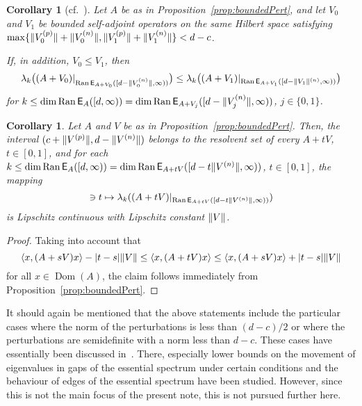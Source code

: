 \documentclass[11pt,a4paper]{amsart}
\numberwithin{equation}{section}
\DeclareMathOperator{\Ran}{Ran}
\DeclareMathOperator{\Dom}{Dom}
\DeclarePairedDelimiter{\abs}{|}{|}
\DeclarePairedDelimiter{\norm}{\lVert}{\rVert}
\DeclarePairedDelimiter{\scprod}{\langle}{\rangle}
\newcommand{\EE}{\mathsf{E}}
\theoremstyle{plain}
\newtheorem{corollary}[theorem]{Corollary}
\theoremstyle{definition}
\theoremstyle{remark}
\begin{document}
\begin{corollary}[{cf.~\cite[Theorem~3.15\,(2) and Theorem~3.14]{NSTTV18}}]\label{cor:monotonicity}
  Let $A$ be as in Proposition~\ref{prop:boundedPert}, and let $V_0$ and $V_1$ be bounded self-adjoint operators on the same
  Hilbert space satisfying $\max\{ \norm{V_0^{(p)}} + \norm{V_0^{(n)}} , \norm{V_1^{(p)}} + \norm{V_1^{(n)}} \} < d - c$.

  If, in addition, $V_0 \le V_1$, then
  \begin{equation*}
    \lambda_k\bigl( (A+V_0)|_{\Ran\EE_{A+V_0}([d-\norm{V_0^{(n)}},\infty))} \bigr)
    \le
    \lambda_k\bigl( (A+V_1)|_{\Ran\EE_{A+V_1}([d-\norm{V_1}^{(n)},\infty))} \bigr)
  \end{equation*}
  for $k \le \dim\Ran\EE_A([d,\infty)) = \dim\Ran\EE_{A+V_j}([d-\norm{V_j^{(n)}},\infty))$, $j\in\{0,1\}$.
\end{corollary}

\begin{corollary}\label{cor:continuity}
  Let $A$ and $V$ be as in Proposition~\ref{prop:boundedPert}. Then, the interval $(c+\norm{V^{(p)}} , d-\norm{V^{(n)}})$ belongs
  to the resolvent set of every $A+tV$, $t \in [0,1]$, and for each
  $k \le \dim \Ran \EE_A([d,\infty)) = \dim \Ran \EE_{A+tV}([d-t\norm{V^{(n)}},\infty))$, $t \in [0,1]$, the mapping
  \begin{equation*}
    [0,1]
    \ni
    t
    \mapsto
    \lambda_k((A+tV)|_{\Ran\EE_{A+tV}([d-t\norm{V^{(n)}},\infty))})
  \end{equation*}
  is Lipschitz continuous with Lipschitz constant $\norm{V}$.
\end{corollary}

\begin{proof}
  Taking into account that
  \begin{equation*}
    \scprod{ x , (A+sV)x } - \abs{t-s}\norm{V}
    \le
    \scprod{ x , (A+tV)x }
    \le
    \scprod{ x , (A+sV)x } + \abs{t-s}\norm{V}
  \end{equation*}
  for all $x \in \Dom(A)$, the claim follows immediately from Proposition~\ref{prop:boundedPert}.
\end{proof}%

It should again be mentioned that the above statements include the particular cases where the norm of the perturbations is less
than $(d - c)/2$ or where the perturbations are semidefinite with a norm less than $d - c$. These cases have essentially been
discussed in~\cite{NSTTV18}. There, especially lower bounds on the movement of eigenvalues in gaps of the essential spectrum
under certain conditions and the behaviour of edges of the essential spectrum have been studied. However, since this is not the
main focus of the present note, this is not pursued further here.
\end{document}
